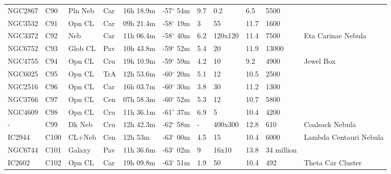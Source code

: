 \documentclass[10pt,twoside,a4paper,english]{article}
\begin{document}
\begin{longtable}{@{}lllllllllll@{}}
NGC2867    & C90           & Pln Neb & Car & 16h 18.9m & -57$^{\circ}$ 54m & 9.7  & 0.2            & 6.5  & 5500          &                                 \\ 
NGC3532    & C91           & Opn CL  & Car & 09h 21.4m & -58$^{\circ}$ 19m & 3    & 55             & 11.7 & 1600          &                                 \\ 
NGC3372    & C92           & Neb     & Car & 11h 06.4m & -58$^{\circ}$ 40m & 6.2  & 120x120        & 11.4 & 7500          & Eta Carinae Nebula              \\ 
NGC6752    & C93           & Glob CL & Pav & 10h 43.8m & -59$^{\circ}$ 52m & 5.4  & 20             & 11.9 & 13000         &                                 \\ 
NGC4755    & C94           & Opn CL  & Cru & 19h 10.9m & -59$^{\circ}$ 59m & 4.2  & 10             & 9.2  & 4900          & Jewel Box                       \\ 
NGC6025    & C95           & Opn CL  & TrA & 12h 53.6m & -60$^{\circ}$ 20m & 5.1  & 12             & 10.5 & 2500          &                                 \\ 
NGC2516    & C96           & Opn CL  & Car & 16h 03.7m & -60$^{\circ}$ 30m & 3.8  & 30             & 11.2 & 1300          &                                 \\ 
NGC3766    & C97           & Opn CL  & Cen & 07h 58.3m & -60$^{\circ}$ 52m & 5.3  & 12             & 10.7 & 5800          &                                 \\ 
NGC4609    & C98           & Opn CL  & Cru & 11h 36.1m & -61$^{\circ}$ 37m & 6.9  & 5              & 10.4 & 4200          &                                 \\ 
-          & C99           & Dk Neb  & Cru & 12h 42.3m & -62$^{\circ}$ 58m & -    & 400x300        & 12.8 & 610           & Coalsack Nebula                 \\ 
IC2944     & C100          & CL+Neb  & Cen & 12h 53m   & -63$^{\circ}$ 00m & 4.5  & 15             & 10.4 & 6000          & Lambda Centauri Nebula          \\ 
NGC6744    & C101          & Galaxy  & Pav & 11h 36.6m & -63$^{\circ}$ 02m & 9    & 16x10          & 13.8 & 34 million    &                                 \\ 
IC2602     & C102          & Opn CL  & Car & 19h 09.8m & -63$^{\circ}$ 51m & 1.9  & 50             & 10.4 & 492           & Theta Car Cluster               \\ 

\end{longtable}
\end{document}
